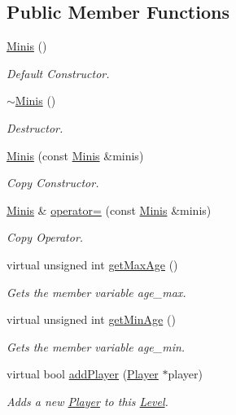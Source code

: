 \subsection*{Public Member Functions}
\begin{DoxyCompactItemize}
\item 
\hyperlink{class_minis_a05a964e8cd328440070a970e95a69aaa}{Minis} ()
\begin{DoxyCompactList}\small\item\em Default Constructor. \end{DoxyCompactList}\item 
\hyperlink{class_minis_a0ce29fd41f5c3f412401128a9dc7dc3b}{$\sim$\+Minis} ()
\begin{DoxyCompactList}\small\item\em Destructor. \end{DoxyCompactList}\item 
\hyperlink{class_minis_a8f19940186bb60864cbf4b2a50a62f44}{Minis} (const \hyperlink{class_minis}{Minis} \&minis)
\begin{DoxyCompactList}\small\item\em Copy Constructor. \end{DoxyCompactList}\item 
\hyperlink{class_minis}{Minis} \& \hyperlink{class_minis_a25cdc8631f19c04d7ddd16507a4bc48c}{operator=} (const \hyperlink{class_minis}{Minis} \&minis)
\begin{DoxyCompactList}\small\item\em Copy Operator. \end{DoxyCompactList}\item 
virtual unsigned int \hyperlink{class_minis_a995e2db860e3a5c110cbead80ab61caa}{get\+Max\+Age} ()
\begin{DoxyCompactList}\small\item\em Gets the member variable age\+\_\+max. \end{DoxyCompactList}\item 
virtual unsigned int \hyperlink{class_minis_a062e99b463e0dd1e370b46e6fb37087a}{get\+Min\+Age} ()
\begin{DoxyCompactList}\small\item\em Gets the member variable age\+\_\+min. \end{DoxyCompactList}\item 
virtual bool \hyperlink{class_minis_a75f45698aaf057d11e083694bfd31d17}{add\+Player} (\hyperlink{class_player}{Player} $\ast$player)
\begin{DoxyCompactList}\small\item\em Adds a new \hyperlink{class_player}{Player} to this \hyperlink{class_level}{Level}. \end{DoxyCompactList}\item 

\end{DoxyCompactItemize}
